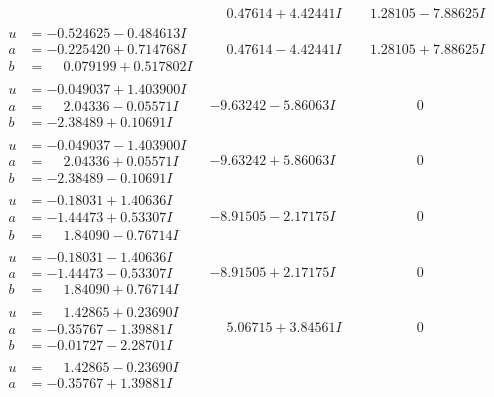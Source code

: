 \documentclass[1p]{elsarticle_modified}
\theoremstyle{definition}
\begin{document}
$$\begin{array}{c|c|c}
 & \phantom{-}0.47614 + 4.42441 I & \phantom{-}1.28105 - 7.88625 I \\ \hline\begin{aligned}
u &= -0.524625 - 0.484613 I \\
a &= -0.225420 + 0.714768 I \\
b &= \phantom{-}0.079199 + 0.517802 I\end{aligned}
 & \phantom{-}0.47614 - 4.42441 I & \phantom{-}1.28105 + 7.88625 I \\ \hline\begin{aligned}
u &= -0.049037 + 1.403900 I \\
a &= \phantom{-}2.04336 - 0.05571 I \\
b &= -2.38489 + 0.10691 I\end{aligned}
 & -9.63242 - 5.86063 I & \phantom{-0.000000 } 0 \\ \hline\begin{aligned}
u &= -0.049037 - 1.403900 I \\
a &= \phantom{-}2.04336 + 0.05571 I \\
b &= -2.38489 - 0.10691 I\end{aligned}
 & -9.63242 + 5.86063 I & \phantom{-0.000000 } 0 \\ \hline\begin{aligned}
u &= -0.18031 + 1.40636 I \\
a &= -1.44473 + 0.53307 I \\
b &= \phantom{-}1.84090 - 0.76714 I\end{aligned}
 & -8.91505 - 2.17175 I & \phantom{-0.000000 } 0 \\ \hline\begin{aligned}
u &= -0.18031 - 1.40636 I \\
a &= -1.44473 - 0.53307 I \\
b &= \phantom{-}1.84090 + 0.76714 I\end{aligned}
 & -8.91505 + 2.17175 I & \phantom{-0.000000 } 0 \\ \hline\begin{aligned}
u &= \phantom{-}1.42865 + 0.23690 I \\
a &= -0.35767 - 1.39881 I \\
b &= -0.01727 - 2.28701 I\end{aligned}
 & \phantom{-}5.06715 + 3.84561 I & \phantom{-0.000000 } 0 \\ \hline\begin{aligned}
u &= \phantom{-}1.42865 - 0.23690 I \\
a &= -0.35767 + 1.39881 I \\

\end{aligned}
\end{array}$$
\end{document}

